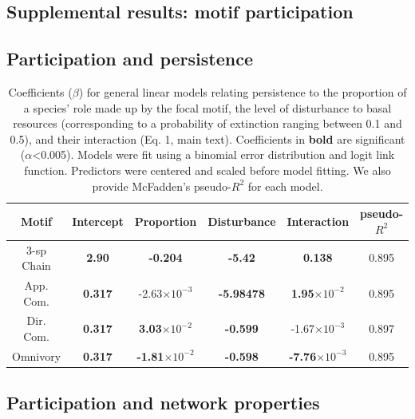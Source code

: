 \documentclass[12pt]{article}
\begin{document}
\begin{spacing}{2.0}
\clearpage


\section{Supplemental results: motif participation} 

    \subsection{Participation and persistence}


    \begin{table}[ht!]
        \centering
        \caption{Coefficients ($\beta$) for general linear models relating persistence to the proportion of a species' role made up by the focal motif, the level of disturbance to basal resources (corresponding to a probability of extinction ranging between 0.1 and 0.5), and their interaction  (Eq. 1, main text). Coefficients in \textbf{bold} are significant ($\alpha$\textless0.005). Models were fit using a binomial error distribution and logit link function. Predictors were centered and scaled before model fitting. We also provide McFadden's pseudo-$R^2$ for each model.}
        \label{tab:proportion}                \footnotesize
        \begin{tabular}{c|c c c c | c }
        Motif & Intercept & Proportion & Disturbance & Interaction & pseudo-$R^2$  \\
        \hline
        3-sp Chain & \textbf{2.90} & \textbf{-0.204} & \textbf{-5.42} & \textbf{0.138} & 0.895 \\
        App. Com. & \textbf{0.317} & -2.63$\times10^{-3}$ & \textbf{-5.98478} & \textbf{1.95$\times10^{-2}$} & 0.895 \\
        Dir. Com. & \textbf{0.317} & \textbf{3.03$\times10^{-2}$} & \textbf{-0.599} & -1.67$\times10^{-3}$ &  0.897 \\
        Omnivory & \textbf{0.317} & \textbf{-1.81$\times10^{-2}$} & \textbf{-0.598} & \textbf{-7.76$\times10^{-3}$} & 0.895 \\
        \end{tabular}
    \end{table}        

\subsection{Participation and network properties} 



\end{spacing}
\end{document}
